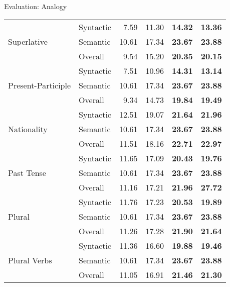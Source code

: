 \documentclass[8pt]{beamer}
\begin{document}
\begin{frame}{Evaluation: Analogy}
\begin{tabular}{ll|rr|rr}
        \multirow{3}{*}{Superlative}        & Syntactic & 7.59      & 11.30     & \bf 14.32 & \bf 13.36         \\
                                            & Semantic  & 10.61     & 17.34     & \bf 23.67 & \bf 23.88         \\
                                            & Overall   & 9.54      & 15.20     & \bf 20.35 & \bf 20.15         \\ \hline
        \multirow{3}{*}{Present-Participle} & Syntactic & 7.51      & 10.96     & \bf 14.31 & \bf 13.14         \\
                                            & Semantic  & 10.61     & 17.34     & \bf 23.67 & \bf 23.88         \\
                                            & Overall   & 9.34      & 14.73     & \bf 19.84 & \bf 19.49         \\ \hline
        \multirow{3}{*}{Nationality}        & Syntactic & 12.51     & 19.07     & \bf 21.64 & \bf 21.96          \\
                                            & Semantic  & 10.61     & 17.34     & \bf 23.67 & \bf 23.88         \\
                                            & Overall   & 11.51     & 18.16     & \bf 22.71 & \bf 22.97         \\ \hline
        \multirow{3}{*}{Past Tense}         & Syntactic & 11.65     & 17.09     & \bf 20.43 & \bf 19.76         \\
                                            & Semantic  & 10.61     & 17.34     & \bf 23.67 & \bf 23.88         \\
                                            & Overall   & 11.16     & 17.21     & \bf 21.96 & \bf 27.72         \\ \hline
        \multirow{3}{*}{Plural}             & Syntactic & 11.76     & 17.23     & \bf 20.53 & \bf 19.89         \\
                                            & Semantic  & 10.61     & 17.34     & \bf 23.67 & \bf 23.88         \\
                                            & Overall   & 11.26     & 17.28     & \bf 21.90 & \bf 21.64         \\ \hline
        \multirow{3}{*}{Plural Verbs}       & Syntactic & 11.36     & 16.60     & \bf 19.88 & \bf 19.46         \\
                                            & Semantic  & 10.61     & 17.34     & \bf 23.67 & \bf 23.88         \\
                                            & Overall   & 11.05     & 16.91     & \bf 21.46 & \bf 21.30         \\ \hline
    \end{tabular}


\end{frame}
\end{document}
